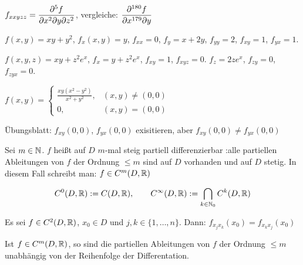 \documentclass[a4paper,twoside,DIV15,BCOR12mm]{scrbook}
\begin{document}
\begin{schreibweisen}
$\displaystyle f_{xxyzz} = \frac{\partial^5 f}{\partial x^2\partial y\partial z^2}$, vergleiche: $\displaystyle\frac{\partial^{180} f}{\partial x^{179}\partial y}$
\end{schreibweisen}

\begin{beispiele}
\item $f(x,y) = xy + y^2$, $f_x(x,y)=y$, $f_{xx} = 0$, $f_y = x + 2y$, $f_{yy} = 2$, $f_{xy}=1$, $f_{yx} = 1$.
\item $f(x,y,z) = xy + z^2e^x$, $f_x = y+z^2e^x$, $f_{xy} = 1$, $f_{xyz} = 0$. $f_z=2ze^x$, $f_{zy}=0$, $f_{zyx} = 0$.
\item $f(x,y) = \begin{cases} \frac{xy(x^2-y^2)}{x^2+y^2}, & (x,y) \ne (0,0) \\ 0, &(x,y)=(0,0)\end{cases}$

Übungsblatt: $f_{xy}(0,0)$, $f_{yx}(0,0)$ exisitieren, aber $f_{xy}(0,0) \ne f_{yx}(0,0)$
\end{beispiele}

\begin{definition}
Sei $m\in\mathbb{N}$. $f$ heißt auf $D$ $m$-mal steig partiell differenzierbar :\equizu alle partiellen Ableitungen  von $f$ der Ordnung $\le m$ sind auf $D$ vorhanden und auf $D$ stetig. In diesem Fall schreibt man: $f\in C^m(D,\mathbb{R})$

$$C^0(D, \mathbb{R}) := C(D,\mathbb{R}),\qquad C^\infty(D,\mathbb{R}) := \bigcap_{k\in\mathbb{N}_0}C^{k}(D,\mathbb{R})$$
\end{definition}

\begin{satz}
Es sei $f\in C^2(D,\mathbb{R})$, $x_0\in D$ und $j,k\in\{1,\ldots,n\}$. Dann: $f_{x_jx_k}(x_0) = f_{x_kx_j}(x_0)$
\end{satz}

\begin{satz}[Folgerung]
Ist $f\in C^m(D,\mathbb{R})$, so sind die partiellen Ableitungen von $f$ der Ordnung $\le m$ unabhängig von der Reihenfolge der Differentation.
\end{satz}
\end{document}
